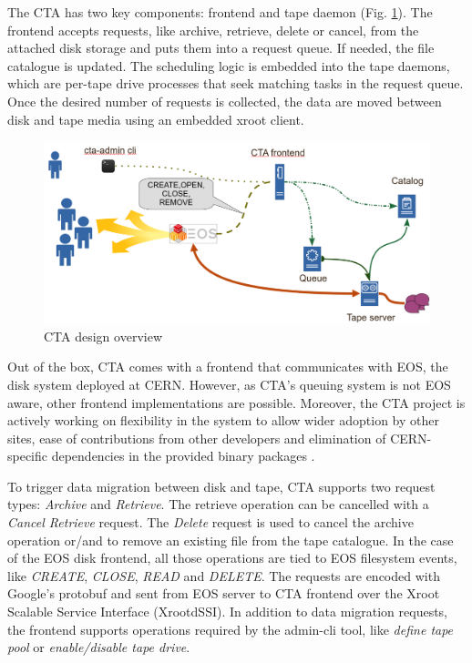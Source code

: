 \documentclass{webofc}
\begin{document}
The CTA has two key components: frontend and tape daemon (Fig. \ref{fig:cta_overview}). The frontend accepts requests, like archive, retrieve, delete or cancel, from the attached disk storage and puts them into a request queue. If needed, the file catalogue is updated. The scheduling logic is embedded into the tape daemons, which are per-tape drive processes that seek matching tasks in the request queue. Once the desired number of requests is collected, the data are moved between disk and tape media using an embedded xroot\cite{xrootd} client.

\begin{figure}[h]
    \centering
    \includegraphics[scale=0.25]{eos+cta.png}
    \caption{CTA design overview}
    \label{fig:cta_overview}
\end{figure}

Out of the box, CTA comes with a frontend that communicates with EOS, the disk system deployed at CERN. However, as CTA's queuing system is not EOS aware, other frontend implementations are possible. Moreover, the CTA project is actively working on flexibility in the system to allow wider adoption by other sites, ease of contributions from other developers and elimination of CERN-specific dependencies in the provided binary packages \cite{cta_beyond_cern}.

To trigger data migration between disk and tape, CTA supports two request types: \textit{Archive} and \textit{Retrieve}. The retrieve operation can be cancelled with a \textit{Cancel Retrieve} request. The \textit{Delete} request is used to cancel the archive operation or/and to remove an existing file from the tape catalogue. In the case of the EOS disk frontend, all those operations are tied to EOS filesystem events, like \textit{CREATE}, \textit{CLOSE}, \textit{READ} and \textit{DELETE}. The requests are encoded with Google's protobuf \cite{prtobuf} and sent from EOS server to CTA frontend over the Xroot Scalable Service Interface (XrootdSSI). In addition to data migration requests, the frontend supports operations required by the admin-cli tool, like \textit{define tape pool} or \textit{enable/disable tape drive}.
\end{document}
